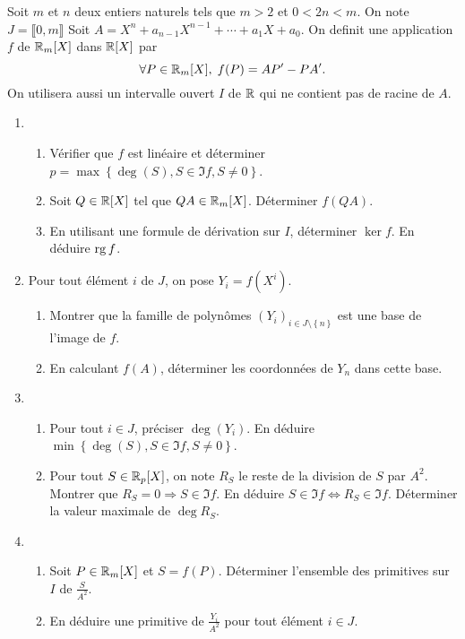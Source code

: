 Soit $m$ et $n$ deux entiers naturels tels que $m > 2$ et $0 < 2n < m$. On note $J=\llbracket 0,m\rrbracket$\newline
Soit $A = X^{n} + a_{n-1}X^{n-1} +  \cdots  + a_{1}X + a_{0}$. On definit une application  $f$ de $\mathbb{R}_{m}[X]$ dans $\mathbb{R}[X]$ par
\[
\forall P \in \mathbb{R}_m[X], \; f(P) = AP' - PA'.
\]
On utilisera aussi un intervalle ouvert $I$ de $\mathbb{R}$ qui ne contient pas de racine de $A$.
\begin{enumerate}
\item \begin{enumerate}
\item Vérifier que $f$ est linéaire et déterminer $p = \max\left\lbrace \deg(S), S\in \Im f , S \neq 0\right\rbrace$.
\item Soit $Q \in \mathbb{R}[X]$ tel que $QA \in \mathbb{R}_{m}[X]$. Déterminer $f(QA)$.
\item En utilisant une formule de dérivation sur $I$, déterminer $\ker f$. En déduire $\operatorname{rg} f$.
\end{enumerate}

\item Pour tout élément $i$ de $J$, on pose $Y_{i}=f(X^{i})$.
\begin{enumerate}
\item Montrer que la famille de polyn{\^o}mes $(Y_{i})_{i\in J \setminus \left\lbrace n \right\rbrace}$ est une base de l'image de $f$.
\item En calculant $f(A)$, déterminer les coordonnées de $Y_{n}$ dans cette base.
\end{enumerate}

\item \begin{enumerate}
\item Pour tout $i\in J$, préciser $\deg(Y_{i})$. En déduire $\min\left\lbrace \deg(S), S\in \Im f , S \neq 0\right\rbrace$.
\item Pour tout $S \in \mathbb{R}_p[X]$, on note $R_S$ le reste de la division de $S$ par $A^{2}$.\newline
Montrer que $R_S = 0 \Rightarrow S \in \Im f$. En déduire  $S \in \Im f \Leftrightarrow R_S \in \Im f$.
Déterminer la valeur maximale de $\deg R_S$.
\end{enumerate}

\item 
\begin{enumerate}
\item Soit $P \in \mathbb{R}_{m}[X]$ et $S=f(P)$. Déterminer l'ensemble des primitives sur $I$ de $\frac{S}{A^{2}}$.
\item En déduire une primitive de $\frac{Y_{i}}{A^{2}}$ pour tout élément $i\in J$.
\end{enumerate}


\end{enumerate}
